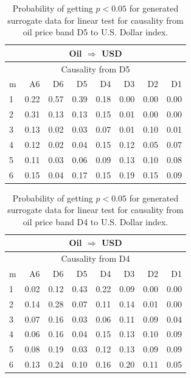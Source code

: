 %
%
\begin{table}[H]
\begin{center}
\begin{tabular}{l|r r r r r r r}
\hline\hline
\multicolumn{8}{c}{Oil $\Rightarrow$ USD}\\
\hline
\multicolumn{8}{c}{Causality from D5}\\
\hline\hline
m & A6 & D6 & D5 & D4 & D3 & D2 & D1 \\
\hline
1 & 0.22 & 0.57 & 0.39 & 0.18 & 0.00 & 0.00 & 0.00 \\
2 & 0.31 & 0.13 & 0.13 & 0.15 & 0.01 & 0.00 & 0.00 \\
3 & 0.13 & 0.02 & 0.03 & 0.07 & 0.01 & 0.10 & 0.01 \\
4 & 0.12 & 0.02 & 0.04 & 0.15 & 0.12 & 0.05 & 0.07 \\
5 & 0.11 & 0.03 & 0.06 & 0.09 & 0.13 & 0.10 & 0.08 \\
6 & 0.15 & 0.04 & 0.17 & 0.15 & 0.19 & 0.15 & 0.09 \\
\hline\hline
\end{tabular}
\caption{Probability of getting $p < 0.05$ for generated surrogate data for linear test for causality from oil price band D5 to U.S. Dollar index.}
\end{center}
\end{table}

%
%
\begin{table}[H]
\begin{center}
\begin{tabular}{l|r r r r r r r}
\hline\hline
\multicolumn{8}{c}{Oil $\Rightarrow$ USD}\\
\hline
\multicolumn{8}{c}{Causality from D4}\\
\hline\hline
m & A6 & D6 & D5 & D4 & D3 & D2 & D1 \\
\hline
1 & 0.02 & 0.12 & 0.43 & 0.22 & 0.09 & 0.00 & 0.00 \\
2 & 0.14 & 0.28 & 0.07 & 0.11 & 0.14 & 0.01 & 0.00 \\
3 & 0.07 & 0.16 & 0.03 & 0.06 & 0.11 & 0.09 & 0.04 \\
4 & 0.06 & 0.16 & 0.04 & 0.15 & 0.13 & 0.10 & 0.09 \\
5 & 0.08 & 0.19 & 0.03 & 0.12 & 0.13 & 0.09 & 0.09 \\
6 & 0.13 & 0.24 & 0.10 & 0.16 & 0.20 & 0.11 & 0.05 \\
\hline\hline
\end{tabular}
\caption{Probability of getting $p < 0.05$ for generated surrogate data for linear test for causality from oil price band D4 to U.S. Dollar index.}
\end{center}
\end{table}

